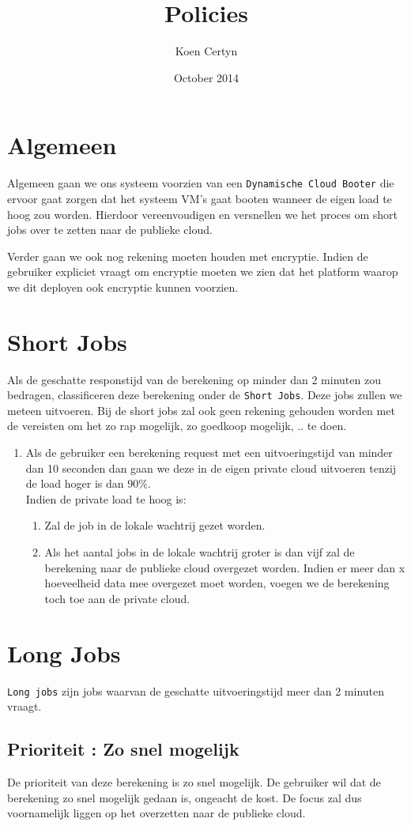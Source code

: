 \documentclass{article}
\title{Policies}
\author{Koen Certyn}
\date{October 2014}
\begin{document}
\section{Algemeen}
Algemeen gaan we ons systeem voorzien van een \texttt{Dynamische Cloud Booter} die ervoor gaat zorgen dat het systeem VM's gaat booten wanneer de eigen load te hoog zou worden.
Hierdoor vereenvoudigen en versnellen we het proces om short jobs over te zetten naar de publieke cloud. 

Verder gaan we ook nog rekening moeten houden met encryptie.  Indien de gebruiker expliciet vraagt om encryptie moeten we zien dat het platform waarop we dit deployen ook encryptie kunnen voorzien.

\section{Short Jobs}
Als de geschatte responstijd van de berekening op minder dan 2 minuten zou bedragen, classificeren deze berekening onder de \texttt{Short Jobs}.  Deze jobs zullen we meteen uitvoeren.  Bij de short jobs zal ook geen rekening gehouden worden met de vereisten om het zo rap mogelijk, zo goedkoop mogelijk, .. te doen.
\begin{enumerate}   
    \item Als de gebruiker een berekening request met een uitvoeringstijd van minder dan 10 seconden dan gaan we deze in de eigen private cloud uitvoeren tenzij de load hoger is dan 90\%.  \\Indien de private load te hoog is:
    \begin{enumerate}
        \item Zal de job in de lokale wachtrij gezet worden.
        \item Als het aantal jobs in de lokale wachtrij groter is dan vijf zal de berekening naar de publieke cloud overgezet worden. Indien er meer dan x hoeveelheid data mee overgezet moet worden, voegen we de berekening toch toe aan de private cloud.
    \end{enumerate}
\end{enumerate}
\section{Long Jobs}
\texttt{Long jobs} zijn jobs waarvan de geschatte uitvoeringstijd meer dan 2 minuten vraagt.
\subsection{Prioriteit : Zo snel mogelijk}
De prioriteit van deze berekening is zo snel mogelijk.  De gebruiker wil dat de berekening zo snel mogelijk gedaan is, ongeacht de kost.  De focus zal dus voornamelijk liggen op het overzetten naar de publieke cloud.
\end{document}
